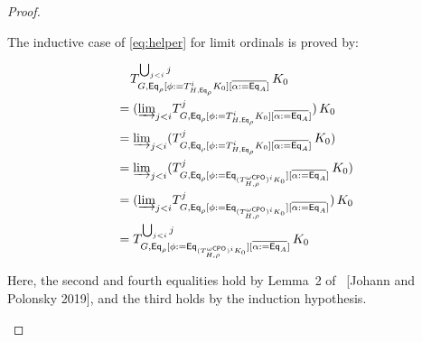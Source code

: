 \documentclass[acmsmall,review,anonymous]{acmart}
\theoremstyle{definition}
\begin{document}
\begin{proof}
\begin{itemize}
\begin{itemize}
{\color{blue} The inductive case of \eqref{eq:helper} for limit
  ordinals is proved by:

\begin{align*}
&\;\;\;\; T^{\bigcup_{j<i}j}_{G, \mathsf{Eq}_{\rho}[\phi :=
      T^{i}_{H,\mathsf{Eq}_{\rho}} K_0][\overline{\alpha := \mathsf{Eq}_A}]}\,K_0\\
&= ({{\underrightarrow{\lim}}_{j < i}{T^{j}_{G, \mathsf{Eq}_{\rho}[\phi :=
      T^{i}_{H,\mathsf{Eq}_{\rho}} K_0][\overline{\alpha := \mathsf{Eq}_A}]}}})\,K_0\\
&= {{\underrightarrow{\lim}}_{j < i}{(T^{j}_{G, \mathsf{Eq}_{\rho}[\phi :=
      T^{i}_{H,\mathsf{Eq}_{\rho}} K_0][\overline{\alpha := \mathsf{Eq}_A}]}\,K_0)}}\\
&= {{\underrightarrow{\lim}}_{j<i}{(T^{j}_{G, \mathsf{Eq}_{\rho}[\phi := \mathsf{Eq}_{(T^{{\omega\mathsf{CPO}}}_{H,\rho})^i
          K_0}][\overline{\alpha := \mathsf{Eq}_A}]}\,K_0)}}\\
&= ({{\underrightarrow{\lim}}_{j<i}{T^{j}_{G, \mathsf{Eq}_{\rho}[\phi := \mathsf{Eq}_{(T^{{\omega\mathsf{CPO}}}_{H,\rho})^i
          K_0}][\overline{\alpha := \mathsf{Eq}_A}]}}})\,K_0\\
&= T^{\bigcup_{j<i}j}_{G, \mathsf{Eq}_{\rho}[\phi := \mathsf{Eq}_{(T^{{\omega\mathsf{CPO}}}_{H,\rho})^i
        K_0}][\overline{\alpha := \mathsf{Eq}_A}]}\,K_0
\end{align*}
} Here, the second and fourth equalities hold by Lemma~2
of~{\color{red} [Johann and Polonsky 2019]}, and the third holds by
the induction hypothesis.


\end{itemize}
\end{itemize}
\end{proof}
\end{document}
